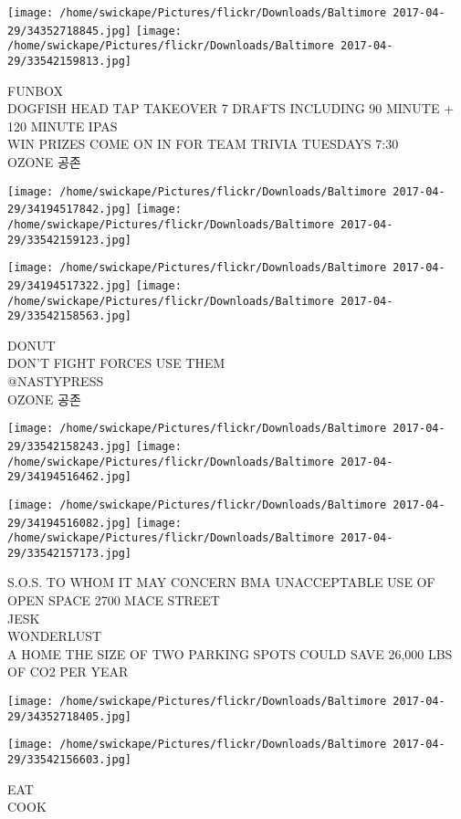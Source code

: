 \documentclass[10pt,letterpaper]{article}
\begin{document}
\texttt{[image: /home/swickape/Pictures/flickr/Downloads/Baltimore 2017-04-29/34352718845.jpg]}
\texttt{[image: /home/swickape/Pictures/flickr/Downloads/Baltimore 2017-04-29/33542159813.jpg]}

FUNBOX\\
DOGFISH HEAD TAP TAKEOVER 7 DRAFTS INCLUDING 90 MINUTE + 120 MINUTE IPAS\\
WIN PRIZES COME ON IN FOR TEAM TRIVIA TUESDAYS 7:30\\
OZONE 공존
\pagebreak

\texttt{[image: /home/swickape/Pictures/flickr/Downloads/Baltimore 2017-04-29/34194517842.jpg]}
\texttt{[image: /home/swickape/Pictures/flickr/Downloads/Baltimore 2017-04-29/33542159123.jpg]}

\texttt{[image: /home/swickape/Pictures/flickr/Downloads/Baltimore 2017-04-29/34194517322.jpg]}
\texttt{[image: /home/swickape/Pictures/flickr/Downloads/Baltimore 2017-04-29/33542158563.jpg]}

DONUT\\
DON'T FIGHT FORCES USE THEM\\
@NASTYPRESS\\
OZONE 공존
\pagebreak

\texttt{[image: /home/swickape/Pictures/flickr/Downloads/Baltimore 2017-04-29/33542158243.jpg]}
\texttt{[image: /home/swickape/Pictures/flickr/Downloads/Baltimore 2017-04-29/34194516462.jpg]}

\texttt{[image: /home/swickape/Pictures/flickr/Downloads/Baltimore 2017-04-29/34194516082.jpg]}
\texttt{[image: /home/swickape/Pictures/flickr/Downloads/Baltimore 2017-04-29/33542157173.jpg]}

S.O.S. TO WHOM IT MAY CONCERN BMA UNACCEPTABLE USE OF OPEN SPACE 2700 MACE STREET\\
JESK\\
WONDERLUST\\
A HOME THE SIZE OF TWO PARKING SPOTS COULD SAVE 26,000 LBS OF CO2 PER YEAR
\pagebreak

\texttt{[image: /home/swickape/Pictures/flickr/Downloads/Baltimore 2017-04-29/34352718405.jpg]}

\vspace{0.25in}
\texttt{[image: /home/swickape/Pictures/flickr/Downloads/Baltimore 2017-04-29/33542156603.jpg]}

EAT\\
COOK
\pagebreak
\end{document}
